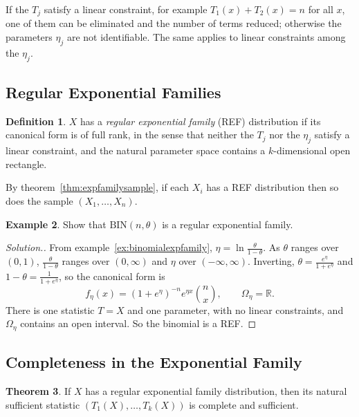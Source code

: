 \documentclass[12pt,a4paper]{report}
\theoremstyle{definition}
\newtheorem{thm}{Theorem}[section]
\newtheorem{defn}[thm]{Definition}
\newtheorem{exa}[thm]{Example}
\newenvironment{solution}
  {\renewcommand{\qedsymbol}{}\begin{proof}[\textit{Solution}.]}
  {\end{proof}}
\begin{document}
If the $T_j$ satisfy a linear constraint, for example $T_1(x) + T_2(x) = n$ for all
$x$, one of them can be eliminated and the number of terms reduced; otherwise the
parameters $\eta_j$ are not identifiable. The same applies to linear constraints
among the $\eta_j$.

\subsection{Regular Exponential Families}

\begin{defn}
\label{def:ref}
$X$ has a \emph{regular exponential family} (REF) distribution if its canonical form
is of full rank, in the sense that neither the $T_j$ nor the $\eta_j$ satisfy a
linear constraint, and the natural parameter space contains a $k$-dimensional
open rectangle.
\end{defn}

By theorem~\ref{thm:expfamilysample}, if each $X_i$ has a REF distribution then so
does the sample $(X_1, \dots, X_n)$.

\begin{exa}
\label{ex:binomialref}
Show that $\text{BIN}(n, \theta)$ is a regular exponential family.
\end{exa}

\begin{solution}
From example~\ref{ex:binomialexpfamily}, $\eta = \ln\frac{\theta}{1 - \theta}$. As
$\theta$ ranges over $(0, 1)$, $\frac\theta{1-\theta}$ ranges over $(0, \infty)$ and
$\eta$ over $(-\infty, \infty)$. Inverting, $\theta = \frac{e^\eta}{1 + e^\eta}$ and
$1 - \theta = \frac{1}{1 + e^\eta}$, so the canonical form is
\[f_\eta(x) = \left(1 + e^\eta\right)^{-n}e^{\eta x}\binom{n}{x},\qquad
\Omega_\eta = \mathbb{R} .\]
There is one statistic $T = X$ and one parameter, with no linear constraints, and
$\Omega_\eta$ contains an open interval. So the binomial is a REF.
\end{solution}

\subsection{Completeness in the Exponential Family}

\begin{thm}
\label{thm:refcomplete}
If $X$ has a regular exponential family distribution, then its natural sufficient
statistic $(T_1(X), \dots, T_k(X))$ is complete and sufficient.
\end{thm}
\end{document}
